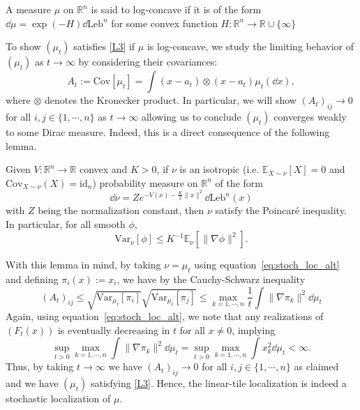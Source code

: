 \begin{definition}
  A measure \(\mu\) on \(\mathbb{R}^n\) is said to log-concave if it is of the form 
  \(\dd \mu = \exp(-H)\dd\text{Leb}^n\) for some convex function \(H : \mathbb{R}^n \to \mathbb{R} \cup \{\infty\}\)
\end{definition}

To show \((\mu_t)\) satisfies \ref{L3} if \(\mu\) is log-concave, we study the limiting behavior of 
\((\mu_t)\) as \(t \to \infty\) by considering their covariances:
\begin{equation}
  A_t := \text{Cov}[\mu_t] = \int (x - a_t) \otimes (x - a_t) \mu_t(\dd x),
\end{equation}
where \(\otimes\) denotes the Kronecker product. In particular, we will show \((A_t)_{ij} \to 0\) for all
 \(i, j \in \{1, \cdots, n\}\) as \(t \to \infty\) allowing us to conclude \((\mu_t)\) converges weakly 
 to some Dirac measure. Indeed, this is a direct consequence of the following lemma.

\begin{lemma}\label{lem:brascamp-lieb}
  Given \(V : \mathbb{R}^n \to \mathbb{R}\) convex and \(K > 0\), if \(\nu\) is an isotropic 
  (i.e. \(\mathbb{E}_{X \sim \nu}[X] = 0\) and \(\text{Cov}_{X \sim \nu}(X) = \text{id}_n\)) probability 
  measure on \(\mathbb{R}^n\) of the form 
  \[\dd \nu = Ze^{-V(x) - \frac{K}{2}\|x\|^2}\dd \text{Leb}^n(x)\]
  with \(Z\) being the normalization constant, then \(\nu\) satisfy the Poincaré inequality. In particular,
  for all smooth \(\phi\),
  \[\text{Var}_\nu[\phi] \le K^{-1} \mathbb{E}_\nu[\|\nabla\phi\|^2].\]
\end{lemma}

With this lemma in mind, by taking \(\nu = \mu_t\) using 
equation~\eqref{eq:stoch_loc_alt} and defining
\(\pi_i(x) := x_i\), we have by the Cauchy-Schwarz inequality
\[(A_t)_{ij} \le \sqrt{\text{Var}_{\mu_t}[\pi_i]}\sqrt{\text{Var}_{\mu_t}[\pi_j]} 
  \le \max_{k = 1, \cdots, n} \frac{1}{t}\int \|\nabla \pi_k\|^2 \dd \mu_t\]
Again, using equation~\eqref{eq:stoch_loc_alt}, we note that any realizations of \((F_t(x))\) is eventually 
decreasing in \(t\) for all \(x \neq 0\), implying 
\[\sup_{t > 0} \max_{k = 1, \cdots, n} \int \|\nabla \pi_k\|^2 \dd \mu_t = 
\sup_{t > 0} \max_{k = 1, \cdots, n} \int x_k^2 \dd \mu_t < \infty.\] 
Thus, by taking \(t \to \infty\) we have \((A_t)_{ij} \to 0\) for all \(i, j \in \{1, \cdots, n\}\) as claimed 
and we have \((\mu_t)\) satisfying \ref{L3}. Hence, the linear-tile localization is indeed a stochastic localization of \(\mu\).

